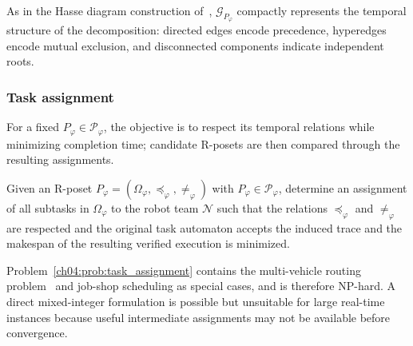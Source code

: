 As in the Hasse diagram construction of~\citet{simovici2008mathematical},
$\mathcal{G}_{P_{\varphi}}$ compactly represents the temporal structure of the
decomposition: directed edges encode precedence, hyperedges encode mutual
exclusion, and disconnected components indicate independent roots.

















\subsubsection{Task assignment}
\label{ch04:subsubsec:task-assignment}

For a fixed $P_{\varphi}\in\mathcal{P}_{\varphi}$, the objective is to respect
its temporal relations while minimizing completion time; candidate R-posets are
then compared through the resulting assignments.

\begin{problem}
\color{blue}
\label{ch04:prob:task_assignment}
Given an R-poset
$P_{\varphi}=(\Omega_{\varphi},\preceq_{\varphi},\neq_{\varphi})$ with
$P_{\varphi}\in\mathcal{P}_{\varphi}$, determine an assignment of all subtasks
in $\Omega_{\varphi}$ to the robot team $\mathcal{N}$ such that the relations
$\preceq_{\varphi}$ and $\neq_{\varphi}$ are respected and the original task automaton accepts the induced trace and the makespan of
the resulting verified execution is minimized.
\end{problem}

Problem~\ref{ch04:prob:task_assignment} contains the multi-vehicle routing
problem~\citep{khamis2015multi} and job-shop scheduling
\citep{morrison2016branch} as special cases, and is therefore NP-hard. A direct
mixed-integer formulation is possible but unsuitable for large real-time
instances because useful intermediate assignments may not be available before
convergence. 

